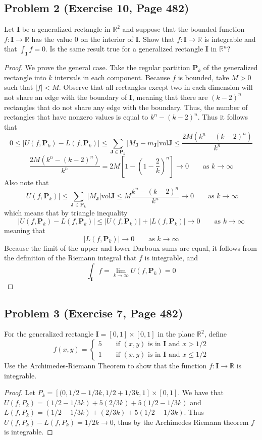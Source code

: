 \documentclass{article}
\begin{document}
\subsection*{Problem 2 (Exercise 10, Page 482)}
Let $\textbf{I}$ be a generalized rectangle in $\mathbb{R}^2$ and suppose that the bounded function $f \colon \textbf{I} \to \mathbb{R}$ has the value $0$ on the interior of $\textbf{I}$. Show that $f \colon \textbf{I} \to \mathbb{R}$ is integrable and that $\int_{\textbf{I}} f = 0$. Is the same result true for a generalized rectangle $\textbf{I}$ in $\mathbb{R}^n$?
\begin{proof} 
We prove the general case. Take the regular partition $\textbf{P}_k$ of the generalized rectangle into $k$ intervals in each component. Because $f$ is bounded, take $M > 0$ such that $|f| < M$. Observe that all rectangles except two in each dimension will not share an edge with the boundary of $\textbf{I}$, meaning that there are $(k-2)^n$ rectangles that do not share any edge with the boundary. Thus, the number of rectangles that have nonzero values is equal to $k^n - (k-2)^n$. Thus it follows that 
\[ 0 \leq |U(f, \textbf{P}_k) - L(f, \textbf{P}_k)| \leq \sum_{\textbf{J} \in \textbf{P}_k}|M_\textbf{J} - m_\textbf{J}|\text{vol}\textbf{J} \leq \frac{2M(k^n-(k-2)^n)}{k^n}\]
\[\frac{2M(k^n-(k-2)^n)}{k^n} = 2M\left[ 1 - (1 - \frac{2}{k})^n\right] \to 0 \qquad \text{as $k \to \infty$}\]
Also note that
\[ |U(f, \textbf{P}_k)| \leq \sum_{\textbf{J} \in \textbf{P}_k}|M_\textbf{J}|\text{vol}\textbf{J} \leq M\frac{k^n - (k-2)^n}{k^n} \to 0 \qquad \text{as $k \to \infty$}\]
which means that by triangle inequality
\[ |U(f, \textbf{P}_k) - L(f, \textbf{P}_k)| \leq |U(f, \textbf{P}_k)| + |L(f, \textbf{P}_k)| \to 0 \qquad \text{as $k \to \infty$}\]
meaning that
\[ |L(f, \textbf{P}_k)| \to 0 \qquad \text{as $k \to \infty$} \]
Because the limit of the upper and lower Darboux sums are equal, it follows from the definition of the Riemann integral that $f$ is integrable, and
\[\int_{\textbf{I}} f = \lim_{k \to \infty} U(f, \textbf{P}_k) = 0\]

\end{proof}

\subsection*{Problem 3 (Exercise 7, Page 482)}
For the generalized rectangle $\textbf{I} = [0, 1] \times [0, 1]$ in the plane $\mathbb{R}^2$, define
\[ f(x, y) = \begin{cases} 5 \qquad \text{if $(x, y)$ is in $\textbf{I}$ and $x > 1/2$}
\\ 1 \qquad \text{if $(x, y)$ is in $\textbf{I}$ and $x \leq 1/2$}
\end{cases}\]
Use the Archimedes-Riemann Theorem to show that the function $f \colon \textbf{I} \to \mathbb{R}$ is integrable.
\begin{proof}
Let $P_k = [(0, 1/2 - 1/3k, 1/2 + 1/3k, 1] \times [0, 1]$. We have that $U(f, P_k) = (1/2 - 1/3k) + 5(2/3k) + 5(1/2-1/3k)$ and $L(f, P_k) = (1/2 - 1/3k) + (2/3k) + 5(1/2 - 1/3k)$. Thus $U(f, P_k) - L(f, P_k) = 1/2k \to 0$, thus by the Archimedes Riemann theorem $f$ is integrable.
\end{proof}
\end{document}
